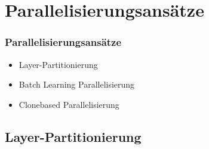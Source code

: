 \documentclass[18pt]{beamer}
\begin{document}
	\section{Parallelisierungsansätze}
	\begin{frame}[c]\frametitle{Parallelisierungsansätze}
		\begin{itemize}
			\item Layer-Partitionierung
			\item Batch Learning Parallelisierung
			\item Clonebased Parallelisierung
		\end{itemize}	
	\end{frame}
	
	\subsection{Layer-Partitionierung}
\end{document}
